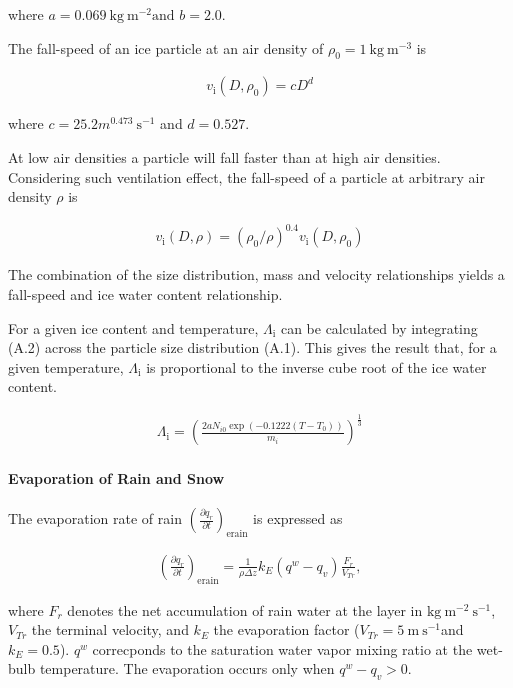 where \(a=0.069 \mathrm{~kg} \mathrm{~m}^{-2} \text {and } b=2.0\).

The fall-speed of an ice particle at an air density of
\(\rho_{0} = 1\mathrm{~kg} \mathrm{~m}^{-3}\) is

\begin{eqnarray}
v_{\text {i}}(D,\rho_0)=c D^{d}
\label{WB99.A3}
\end{eqnarray}

where \(c=25.2 m^{0.473} \mathrm{~s}^{-1}\) and \(d=0.527 .\)

At low air densities a particle will fall faster than at high air
densities. Considering such ventilation effect, the fall-speed of a
particle at arbitrary air density \(\rho\) is

\begin{eqnarray}
v_{\text {i}}(D,\rho)=\left(\rho_{0} / \rho\right)^{0.4} v_{\text {i}}\left(D,\rho_{0}\right)
\label{WB99.A6}
\end{eqnarray}

The combination of the size distribution, mass and velocity
relationships yields a fall-speed and ice water content relationship.

For a given ice content and temperature, \(\Lambda_{\text {i}}\) can be
calculated by integrating (A.2) across the particle size distribution
(A.1). This gives the result that, for a given temperature,
\(\Lambda_{\text {i}}\) is proportional to the inverse cube root of the
ice water content.

\begin{eqnarray}
\Lambda_{\text {i}} = \left(\frac{2aN_{i0}\exp (-0.1222 (T-T_{0}))}{m_i}\right)^{\frac{1}{3}}
\end{eqnarray}

\hypertarget{evaporation-of-rain-and-snow}{%
\paragraph{Evaporation of Rain and
Snow}\label{evaporation-of-rain-and-snow}}

The evaporation rate of rain
\(\left(\frac{\partial q_r}{\partial t}\right)_{\text {erain}}\) is
expressed as

\begin{eqnarray}
\left(\frac{\partial q_r}{\partial t}\right)_{\text {erain}}
=\frac{1}{\rho \Delta z}k_{E}\left(q^{w}-q_v\right) \frac{F_r}{V_{Tr}},
\end{eqnarray}

where \(F_r\) denotes the net accumulation of rain water at the layer in
\(\mathrm{kg} \mathrm{~m}^{-2} \mathrm{~s}^{-1}\), \(V_{Tr}\) the
terminal velocity, and \(k_E\) the evaporation factor
(\(V_{Tr} = 5\mathrm{~m} \mathrm{~s}^{-1}\)and \(k_E = 0.5\)). \(q^w\)
correcponds to the saturation water vapor mixing ratio at the wet-bulb
temperature. The evaporation occurs only when \(q^{w}-q_v>0\).

